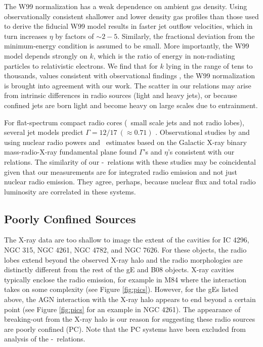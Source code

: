 \documentclass{emulateapj}
\begin{document}
The W99 normalization has a weak dependence on ambient gas density.
Using observationally consistent shallower and lower density gas
profiles than those used to derive the fiducial W99 model results in
faster jet outflow velocities, which in turn increases $\eta$ by
factors of $\sim 2-5$. Similarly, the fractional deviation from the
minimum-energy condition is assumed to be small. More importantly, the
W99 model depends strongly on $k$, which is the ratio of energy in
non-radiating particles to relativistic electrons. We find that for
$k$ lying in the range of tens to thousands, values consistent with
observational findings \citep{2005MNRAS.364.1343D,
  2006MNRAS.372.1741D, 2006ApJ...648..200D, birzan08}, the W99
normalization is brought into agreement with our work. The scatter in
our relations may arise from intrinsic differences in radio sources
(light and heavy jets), or because confined jets are born light and
become heavy on large scales due to entrainment.

For flat-spectrum compact radio cores (\ie\ small scale jets and not
radio lobes), several jet models predict $\Gamma = 12/17 ~(\approx
0.71)$ \citep{1979ApJ...232...34B, 1995A&A...293..665F,
  2003MNRAS.343L..59H}. Observational studies by
\citet{2005ApJ...633..384H} and \citet{2007MNRAS.381..589M} using
nuclear radio powers and \pjet\ estimates based on the Galactic X-ray
binary mass-radio-X-ray fundamental plane \citep{2003MNRAS.344...60G,
  2003MNRAS.345.1057M} found $\Gamma$'s and $\eta$'s consistent with
our relations. The similarity of our \pjet-\prad\ relations with these
studies may be coincidental given that our measurements are for
integrated radio emission and not just nuclear radio emission. They
agree, perhaps, because nuclear flux and total radio luminosity are
correlated in these systems.

\subsection{Poorly Confined Sources}
\label{sec:jet}

The X-ray data are too shallow to image the extent of the cavities for
IC 4296, NGC 315, NGC 4261, NGC 4782, and NGC 7626. For these objects,
the radio lobes extend beyond the observed X-ray halo and the radio
morphologies are distinctly different from the rest of the gE and B08
objects. X-ray cavities typically enclose the radio emission, for
example in M84 \citep{2008ApJ...686..911F} where the interaction takes
on some complexity (see Figure \ref{fig:pics}). However, for the gEs
listed above, the AGN interaction with the X-ray halo appears to end
beyond a certain point (see Figure \ref{fig:pics} for an example in
NGC 4261). The appearance of breaking-out from the X-ray halo is our
reason for suggesting these radio sources are poorly confined
(PC). Note that the PC systems have been excluded from analysis of the
\pjet-\prad\ relations.
\end{document}
